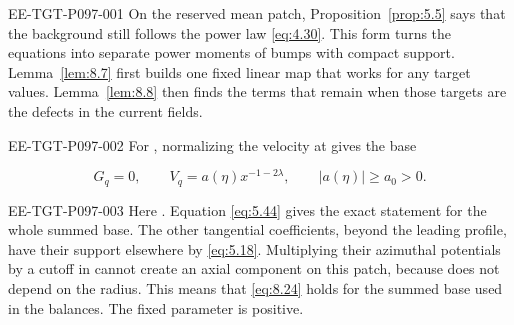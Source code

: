 %
\begin{EESegment}{EE-TGT-P097-001}
On the reserved mean patch, Proposition~\ref{prop:5.5} says that the background still follows the
power law \eqref{eq:4.30}. This form turns the equations into separate power moments of bumps with
compact support. Lemma~\ref{lem:8.7} first builds one fixed linear map that works for any target
values. Lemma~\ref{lem:8.8} then finds the terms that remain when those targets are the defects in
the current fields.
\end{EESegment}

\begin{EESegment}{EE-TGT-P097-002}
For , normalizing the velocity at
 gives the base
\end{EESegment}
\begin{equation}
G_q=0,\qquad V_q=a(\eta)x^{-1-2\lambda},\qquad |a(\eta)|\ge a_0>0.
\tag{8.24}\label{eq:8.24}
\end{equation}
\begin{EESegment}{EE-TGT-P097-003}
Here . Equation
\eqref{eq:5.44} gives the exact statement for the whole summed base. The other tangential
coefficients, beyond the leading profile, have their support elsewhere by \eqref{eq:5.18}.
Multiplying their azimuthal potentials by a cutoff in  cannot create an axial
component on this patch, because  does not depend on the radius. This means
that \eqref{eq:8.24} holds for the summed base used in the balances. The fixed parameter
 is positive.
\end{EESegment}

